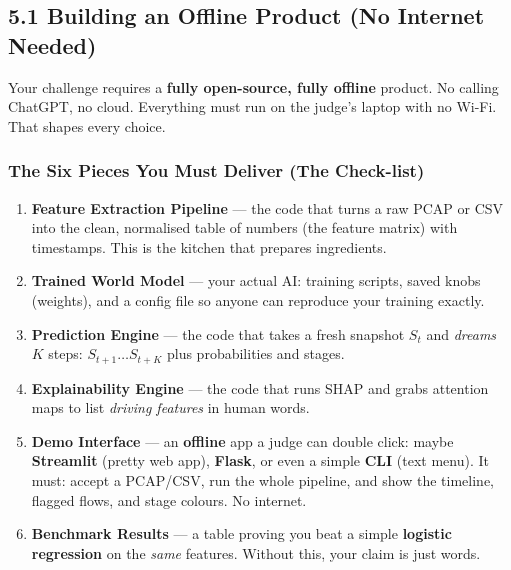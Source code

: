 \documentclass[11pt,a4paper]{article}
\begin{document}
\subsection{5.1 Building an Offline Product (No Internet Needed)}
\label{sec:offline}

Your challenge requires a \textbf{fully open-source, fully offline} product.
No calling ChatGPT, no cloud. Everything must run on the judge's laptop with
no Wi-Fi. That shapes every choice.

\subsubsection{The Six Pieces You Must Deliver (The Check-list)}

\begin{enumerate}[leftmargin=1.8em,itemsep=2pt]
  \item \textbf{Feature Extraction Pipeline} --- the code that turns a raw
        PCAP or CSV into the clean, normalised table of numbers (the feature
        matrix) with timestamps. This is the kitchen that prepares ingredients.

  \item \textbf{Trained World Model} --- your actual AI: training scripts,
        saved knobs (weights), and a config file so anyone can reproduce your
training exactly.

  \item \textbf{Prediction Engine} --- the code that takes a fresh snapshot
$S_t$ and \emph{dreams} $K$ steps: $S_{t+1}\dots S_{t+K}$ plus
probabilities and stages.

  \item \textbf{Explainability Engine} --- the code that runs SHAP and grabs
attention maps to list \emph{driving features} in human words.

  \item \textbf{Demo Interface} --- an \textbf{offline} app a judge can double
click: maybe \textbf{Streamlit} (pretty web app), \textbf{Flask}, or
even a simple \textbf{CLI} (text menu). It must: accept a PCAP/CSV,
run the whole pipeline, and show the timeline, flagged flows, and stage
colours. No internet.

  \item \textbf{Benchmark Results} --- a table proving you beat a simple
\textbf{logistic regression} on the \emph{same} features. Without this,
your claim is just words.
\end{enumerate}
\end{document}
